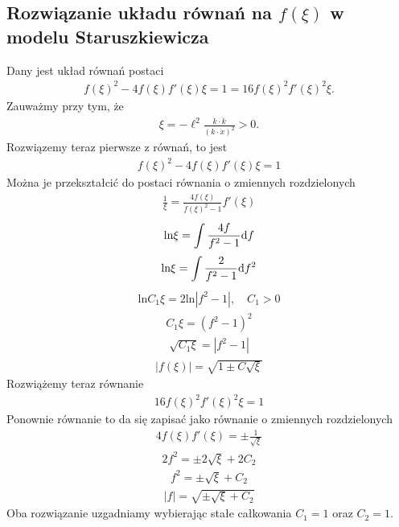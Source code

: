 \subsection{Rozwiązanie układu równań na $f(\xi)$  w modelu Staruszkiewicza}
\noindent
Dany jest układ równań postaci 
\begin{align*} 
 f(\xi)^2- 4 f(\xi) f'(\xi) \xi
 =  1 =
  16   f(\xi)^2 f'(\xi)^2 \xi .
\end{align*}
Zauważmy przy tym, że 
\begin{align*}
\xi = - \ell^2 \frac{\dot{k} \cdot \dot{k}}{ ( k \cdot \dot{x})^2 } > 0.
\end{align*}
Rozwiązemy teraz pierwsze z równań, to jest
\begin{align*} 
 f(\xi)^2- 4 f(\xi) f'(\xi) \xi =  1 
\end{align*}
Można je przekształcić do postaci równania o zmiennych 
rozdzielonych
\begin{align*} 
\frac{1}{\xi} = \frac{ 4 f(\xi) }{ f(\xi)^2-1} f'(\xi) 
\end{align*}
\begin{align*} 
\text{ln} \xi = \int \frac{ 4 f }{ f^2-1} \text{d} f 
\end{align*}
\begin{align*} 
\text{ln} \xi = \int \frac{ 2 }{ f^2-1} \text{d} f^2 
\end{align*}
\begin{align*} 
\text{ln} C_1 \xi = 2\text{ln}|f^2-1|, \quad C_1>0
\end{align*}
\begin{align*} 
 C_1 \xi  = (f^2-1)^2 
\end{align*}
\begin{align*} 
 \sqrt{ C_1 \xi}  = | f^2-1 | 
\end{align*}
\begin{align*} 
|f(\xi)| =  \sqrt{ 1 \pm C\sqrt{ \xi} } 
\end{align*}
Rozwiążemy teraz równanie
\begin{align*} 
  16   f(\xi)^2 f'(\xi)^2 \xi  = 1
\end{align*}
Ponownie równanie to da się zapisać jako równanie o 
zmiennych rozdzielonych
\begin{align*} 
  4  f(\xi) f'(\xi)   =\pm \frac{1}{\sqrt{\xi}}
\end{align*}
\begin{align*} 
  2 f^2   =\pm 2 \sqrt{\xi} + 2 C_2
\end{align*}
\begin{align*} 
   f^2   =\pm  \sqrt{\xi} + C_2
\end{align*}
\begin{align*} 
   |f|   =\sqrt{ \pm  \sqrt{\xi} + C_2 }
\end{align*}
Oba rozwiązanie uzgadniamy wybierając 
stałe całkowania $C_1 = 1$ oraz $C_2=1$.


